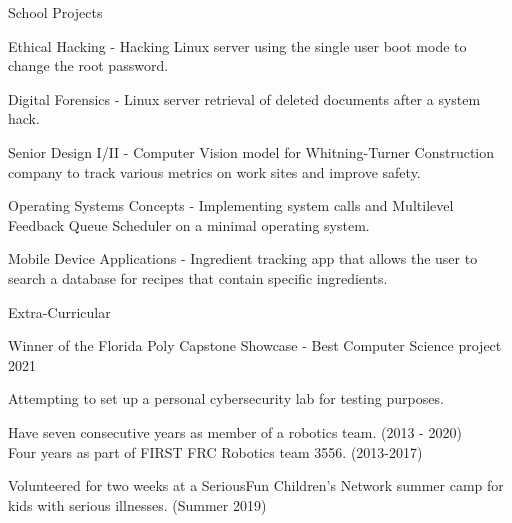 \documentclass{resume} %
\begin{document}
\begin{rSection}{School Projects} \itemsep -3pt
	\item Ethical Hacking - Hacking Linux server using the single user boot mode to change the root password.
	\item Digital Forensics - Linux server retrieval of deleted documents after a system hack.
	\item Senior Design I/II - Computer Vision model for Whitning-Turner Construction company to track various metrics on work sites and improve safety.
	\item Operating Systems Concepts - Implementing system calls and Multilevel Feedback Queue Scheduler on a minimal operating system.
	\item Mobile Device Applications - Ingredient tracking app that allows the user to search a database for recipes that contain specific ingredients.
\end{rSection}

\begin{rSection}{Extra-Curricular} \itemsep -3pt
	\item Winner of the Florida Poly Capstone Showcase - Best Computer Science project 2021
	\item Attempting to set up a personal cybersecurity lab for testing purposes.
	\item Have seven consecutive years as member of a robotics team. (2013 - 2020)\\
	Four years as part of FIRST FRC Robotics team 3556. (2013-2017)
	\item Volunteered for two weeks at a SeriousFun Children's Network summer camp for kids with serious illnesses. (Summer 2019)
\end{rSection}

\end{document}
